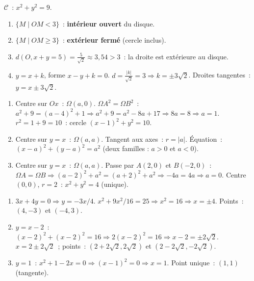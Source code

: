 
$\mathcal{C}$~: $x^2+y^2=9$.
\begin{enumerate}
  \item $\{M\mid OM<3\}$~: \textbf{int\'erieur ouvert} du disque.
  \item $\{M\mid OM\geq3\}$~: \textbf{ext\'erieur ferm\'e} (cercle inclus).
  \item $d(O, x+y=5)=\frac{5}{\sqrt{2}}\approx3{,}54>3$~: la droite est ext\'erieure au disque.
  \item $y=x+k$, forme $x-y+k=0$. $d=\frac{|k|}{\sqrt{2}}=3\Rightarrow k=\pm3\sqrt{2}$.
        Droites tangentes~: $y=x\pm3\sqrt{2}$.
\end{enumerate}


\begin{enumerate}
  \item Centre sur $Ox$~: $\Omega(a,0)$. $\Omega A^2=\Omega B^2$~:
        $a^2+9=(a-4)^2+1\Rightarrow a^2+9=a^2-8a+17\Rightarrow8a=8\Rightarrow a=1$.
        $r^2=1+9=10$~: cercle $(x-1)^2+y^2=10$.
  \item Centre sur $y=x$~: $\Omega(a,a)$. Tangent aux axes~: $r=|a|$.
        \'Equation~: $(x-a)^2+(y-a)^2=a^2$ (deux familles : $a>0$ et $a<0$).
  \item Centre sur $y=x$~: $\Omega(a,a)$. Passe par $A(2,0)$ et $B(-2,0)$~:
        $\Omega A=\Omega B\Rightarrow(a-2)^2+a^2=(a+2)^2+a^2\Rightarrow-4a=4a\Rightarrow a=0$.
        Centre $(0,0)$, $r=2$~: $x^2+y^2=4$ (unique).
\end{enumerate}


\begin{enumerate}
  \item $3x+4y=0\Rightarrow y=-3x/4$. $x^2+9x^2/16=25\Rightarrow x^2=16\Rightarrow x=\pm4$.
        Points~: $(4,-3)$ et $(-4,3)$.
  \item $y=x-2$~: $(x-2)^2+(x-2)^2=16\Rightarrow2(x-2)^2=16\Rightarrow x-2=\pm2\sqrt{2}$.
        $x=2\pm2\sqrt{2}$~; points~: $(2+2\sqrt{2},2\sqrt{2})$ et $(2-2\sqrt{2},-2\sqrt{2})$.
  \item $y=1$~: $x^2+1-2x=0\Rightarrow(x-1)^2=0\Rightarrow x=1$.
        Point unique~: $(1,1)$ (tangente).
\end{enumerate}

